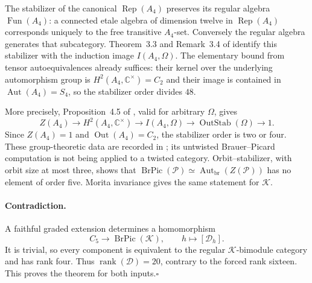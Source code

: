 The stabilizer of the canonical $\operatorname{Rep}(A_4)$ preserves its
regular algebra $\operatorname{Fun}(A_4)$: a connected etale algebra of
dimension twelve in $\operatorname{Rep}(A_4)$ corresponds uniquely to the
free transitive $A_4$-set. Conversely the regular algebra generates that
subcategory. Theorem~3.3 and Remark~3.4 of \cite{MarshallNikshych} identify
this stabilizer with the induction image $I(A_4,\Omega)$.
The elementary bound from tensor autoequivalences already suffices:
their kernel over the underlying automorphism group is
$H^2(A_4,\mathbb C^\times)=C_2$ and their image is contained in
$\operatorname{Aut}(A_4)=S_4$, so the stabilizer order divides $48$.

More precisely, Proposition~4.5 of \cite{MarshallNikshych}, valid for
arbitrary $\Omega$, gives
\[
 Z(A_4)\longrightarrow H^2(A_4,\mathbb C^\times)
 \longrightarrow I(A_4,\Omega)
 \longrightarrow\operatorname{OutStab}(\Omega)\longrightarrow1.
\]
Since $Z(A_4)=1$ and $\operatorname{Out}(A_4)=C_2$, the stabilizer order
is two or four. These group-theoretic data are recorded in
\cite[Section~8.3]{NikshychRiepel}; its untwisted Brauer--Picard computation
is not being applied to a twisted category.
Orbit--stabilizer, with orbit size at most three, shows that
$\operatorname{BrPic}(\mathcal P)\simeq
\operatorname{Aut}_{\mathrm{br}}(Z(\mathcal P))$ has no element of order
five. Morita invariance gives the same statement for $\mathcal K$.

\paragraph{Contradiction.}
A faithful graded extension determines a homomorphism
\[
 C_5\longrightarrow\operatorname{BrPic}(\mathcal K),
 \qquad h\longmapsto[\mathcal D_h].
\]
It is trivial, so every component is equivalent to the regular
$\mathcal K$-bimodule category and has rank four. Thus
$\operatorname{rank}(\mathcal D)=20$, contrary to the forced rank sixteen.
This proves the theorem for both inputs.\hfill$\square$
